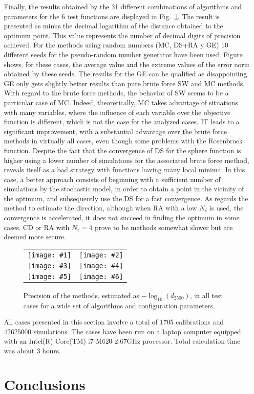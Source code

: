 \documentclass[review,authoryear]{elsarticle}
\newcommand{\FIGVI}[8]
{
	\begin{figure}[ht!]
		\centering
		\begin{tabular}{cc}
			\texttt{[image: \#1]} & \texttt{[image: \#2]} \\
			\texttt{[image: \#3]} & \texttt{[image: \#4]} \\
			\texttt{[image: \#5]} & \texttt{[image: \#6]}
		\end{tabular}
		\caption{#7.\label{#8}}
	\end{figure}
}
\newcommand{\PA}[1]{\left(#1\right)}
\begin{document}
Finally, the results obtained by the 31 different combinations of algorithms
and parameters for the 6 test functions are displayed in
Fig.~\ref{FigTestResults}. 
The result is presented as minus the decimal logarithm of the distance obtained
to the optimum point. This value represents the number of decimal digits of 
precision achieved.
For the methods using random numbers (MC, DS+RA y GE) 10 different
seeds for the pseudo-random number generator have been used. Figure shows, for
these cases, the average value and the extreme values of the error norm obtained
by these seeds. 
The results for the GE can be qualified as disappointing. GE only gets slightly
better results than pure brute force SW and MC methods.
With regard to the brute force methods, the behavior of SW seems to be a
particular case of MC. Indeed, theoretically, MC takes advantage of situations
with many variables, where the influence of each  variable over the objective
function is different, which is not the case for the analyzed cases.
IT leads to a significant improvement, with a substantial advantage over the
brute force methods in virtually all cases, even though some problems with the
Rosenbrock function. 
Despite the fact that the convergence of DS for the sphere function is higher
using a lower number of simulations for the associated brute force method,
reveals itself as a bad strategy with functions having many local minima. In this case,
a better approach consists of beginning with a sufficient number of simulations
by the stochastic model, in order to obtain a point in the vicinity of the
optimum, and subsequently use the DS for a fast convergence. As regards the
method to estimate the direction, although when RA with a low $N_e$ is used, the
convergence is accelerated, it does not succeed in finding the optimum in some
cases. CD or RA with $N_e=4$ prove to be methods somewhat slower but are deemed
more secure.
\FIGVI{Sphere-e.eps}{Ackley-e.eps}{Booth-e.eps}{Rosenbrock-e.eps}{Easom-e.eps}
{Beale-e.eps}{Precision of the methods, estimated as $-\log_{10}\PA{d_{2500}}$,
in all test cases for a wide set of algorithms and configuration parameters}
{FigTestResults}

All cases presented in this section involve a total of 1705 calibrations and
42625000 simulations. The cases have been run on a laptop
computer equipped with an Intel(R) Core(TM) i7 M620 2.67GHz processor. Total
calculation time was about 3 hours.

\section{Conclusions}
\end{document}
